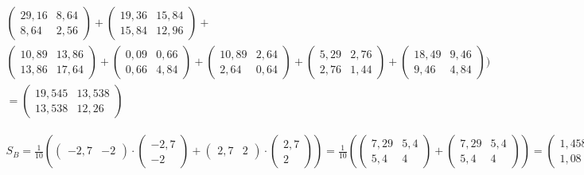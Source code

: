 \documentclass[a4paper,parskip=full-]{article}
\begin{document}
\begin{multline*}
\begin{pmatrix} 29,16 & 8,64 \\ 8,64 & 2,56 \end{pmatrix} +
\begin{pmatrix} 19,36 & 15,84 \\ 15,84 & 12,96 \end{pmatrix} + \\
\begin{pmatrix} 10,89 & 13,86 \\ 13,86 & 17,64 \end{pmatrix} +
\begin{pmatrix} 0,09 & 0,66 \\ 0,66 & 4,84 \end{pmatrix} +
\begin{pmatrix} 10,89 & 2,64 \\ 2,64 & 0,64 \end{pmatrix} +
\begin{pmatrix} 5,29 & 2,76 \\ 2,76 & 1,44 \end{pmatrix} +
\begin{pmatrix} 18,49 & 9,46 \\ 9,46 & 4,84 \end{pmatrix} \Biggr) \\
= \begin{pmatrix} 
19,545 & 13,538 \\ 
13,538 & 12,26 
\end{pmatrix}
\end{multline*}

\begin{multline*}
S_B = \frac{1}{10}\left(  
\begin{pmatrix} -2,7 &  -2 \end{pmatrix} \cdot
\begin{pmatrix} -2,7 \\ -2 \end{pmatrix} +
\begin{pmatrix} 2,7 &  2 \end{pmatrix} \cdot
\begin{pmatrix} 2,7 \\ 2 \end{pmatrix}
\right)
= \frac{1}{10}\left( 
\begin{pmatrix} 7,29 & 5,4 \\ 5,4 & 4 \end{pmatrix} +
\begin{pmatrix} 7,29 & 5,4 \\ 5,4 & 4 \end{pmatrix}
\right)
= \begin{pmatrix} 1,458 & 1,08 \\ 1,08 & 0,8 \end{pmatrix}
\end{multline*}
\end{document}
